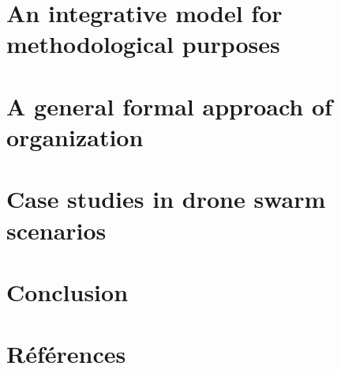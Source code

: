 \documentclass[conference]{IEEEtran}
\begin{document}
\section{An integrative model for methodological purposes}


\section{A general formal approach of organization}


\section{Case studies in drone swarm scenarios}


\section{Conclusion}


\section*{Références}

% 



\end{document}
